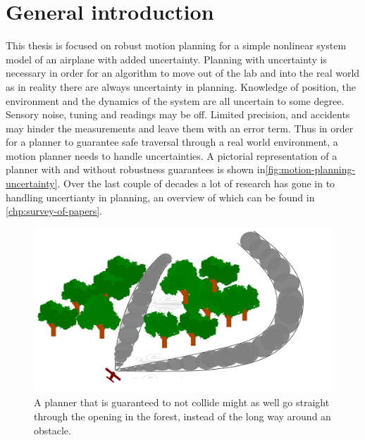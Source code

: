 \section{General introduction}

This thesis is focused on robust motion planning for a simple nonlinear system
model of an airplane with added uncertainty. Planning with uncertainty is
necessary in order for an algorithm to move out of the lab and into the real
world as in reality there are always uncertainty in planning. Knowledge of
position, the environment and the dynamics of the system are all uncertain to
some degree. Sensory noise, tuning and readings may be off. Limited precision,
and accidents may hinder the measurements and leave them with an error term.
Thus in order for a planner to guarantee safe traversal through a real world
environment, a motion planner needs to handle uncertainties. A pictorial
representation of a planner with and without robustness guarantees is shown
in\cref{fig:motion-planning-uncertainty}. Over the last couple of decades a lot
of research has gone in to handling uncertianty in planning, an overview of
which can be found in \cref{chp:survey-of-papers}.

\begin{figure}[h]
  \centering
  \includegraphics[scale=0.1]{figures/experiments/aggressive-maneuver}
  \caption{A planner that is guaranteed to not collide might as well go straight
    through the opening in the forest, instead of the long way around an
    obstacle.}
  \label{fig:aggressive-maneuver}
\end{figure}

